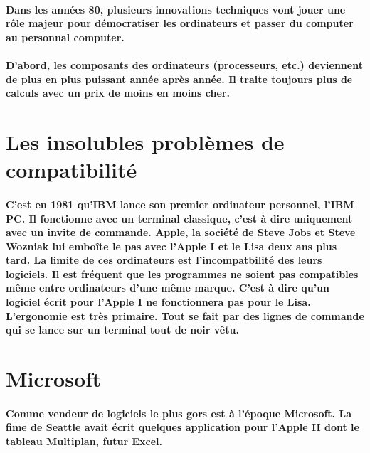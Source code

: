 \paragraph{
  Dans les années 80, plusieurs innovations techniques vont jouer une rôle majeur pour démocratiser les ordinateurs et passer du computer au personnal computer.
}

\paragraph{
  D'abord, les composants des ordinateurs (processeurs, etc.) deviennent de plus en plus puissant année après année. Il traite toujours plus de calculs avec un prix de moins en moins cher.
}

\section*{Les insolubles problèmes de compatibilité}

\paragraph{
  C'est en 1981 qu'IBM lance son premier ordinateur personnel, l'IBM PC. Il fonctionne avec un terminal classique, c'est à dire uniquement avec un invite de commande. Apple, la société de Steve Jobs et Steve Wozniak lui emboîte le pas avec l'Apple I et le Lisa deux ans plus tard. La limite de ces ordinateurs est l'incompatbilité des leurs logiciels. Il est fréquent que les programmes ne soient pas compatibles même entre ordinateurs d'une même marque. C'est à dire qu'un logiciel écrit pour l'Apple I ne fonctionnera pas pour le Lisa. L'ergonomie est très primaire. Tout se fait par des lignes de commande qui se lance sur un terminal tout de noir vêtu.
}

\section*{Microsoft}

\paragraph{
  Comme vendeur de logiciels le plus gors est à l'époque Microsoft. La fime de Seattle avait écrit quelques application pour l'Apple II dont le tableau Multiplan, futur Excel.
}

